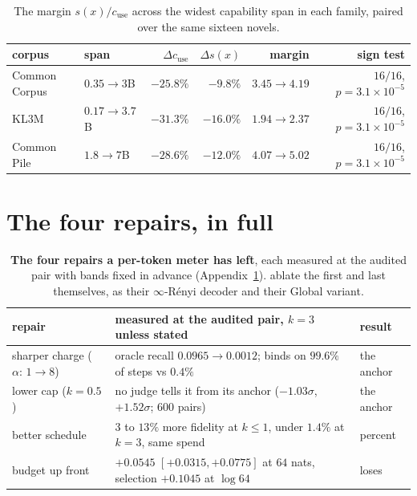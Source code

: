 \begin{table}[ht]
\centering\footnotesize
\caption{The margin $s(x)/c_{\mathrm{use}}$ across the widest capability span in each family, paired over the
same sixteen novels.}\label{tab:marginspan}
\begin{tabular}{@{}llrrrr@{}}
\toprule
corpus & span & $\Delta c_{\mathrm{use}}$ & $\Delta s(x)$ & margin & sign test \\
\midrule
Common Corpus & $0.35 \to 3$B   & $-25.8\%$ & $-9.8\%$  & $3.45 \to 4.19$ & $16/16$, $p = 3.1\times10^{-5}$ \\
KL3M          & $0.17 \to 3.7$B & $-31.3\%$ & $-16.0\%$ & $1.94 \to 2.37$ & $16/16$, $p = 3.1\times10^{-5}$ \\
Common Pile   & $1.8 \to 7$B    & $-28.6\%$ & $-12.0\%$ & $4.07 \to 5.02$ & $16/16$, $p = 3.1\times10^{-5}$ \\
\bottomrule
\end{tabular}
\end{table}

\section{The four repairs, in full}\label{app:repairs}

\begin{table}[ht]
\centering\footnotesize
\caption{\textbf{The four repairs a per-token meter has left}, each measured at the audited pair with
bands fixed in advance (Appendix~\ref{app:repairs}). \citet{he2026anchored} ablate the first and last
themselves, as their $\infty$-R\'enyi decoder and their Global variant.}
\label{tab:repairs}
\setlength{\tabcolsep}{3pt}
\begin{tabular}{@{}lll@{}}
\toprule
repair & measured at the audited pair, $k=3$ unless stated & result \\
\midrule
sharper charge ($\alpha{:}\,1 {\to} 8$) & oracle recall $0.0965 \to 0.0012$; binds on $99.6\%$ of steps vs $0.4\%$ & the anchor \\
lower cap ($k = 0.5$) & no judge tells it from its anchor ($-1.03\sigma$, $+1.52\sigma$; $600$ pairs) & the anchor \\
better schedule & $3$ to $13\%$ more fidelity at $k \le 1$, under $1.4\%$ at $k=3$, same spend & percent \\
budget up front & $+0.0545$ $[+0.0315, +0.0775]$ at $64$ nats, selection $+0.1045$ at $\log 64$ & loses \\
\bottomrule
\end{tabular}
\end{table}


